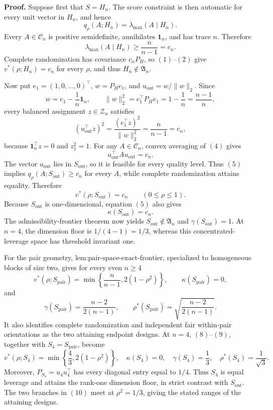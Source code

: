 \textbf{Proof.}
Suppose first that \(S=H_n\). The score constraint is then automatic for every unit vector in \(H_n\), and hence
\[
q_\rho(A;H_n)=\lambda_{\max}(A\mid H_n).
\tag{1}
\]
Every \(A\in\mathcal C_n\) is positive semidefinite, annihilates \(\mathbf1_n\), and has trace \(n\). Therefore
\[
\lambda_{\max}(A\mid H_n)\geq\frac{n}{n-1}=c_n.
\tag{2}
\]
Complete randomization has covariance \(c_nP_H\), so \((1)\)--\((2)\) give \(v^*(\rho;H_n)=c_n\) for every \(\rho\), and thus \(H_n\notin\mathfrak A_n\).

Now put \(e_1=(1,0,\ldots,0)^\top\), \(w=P_He_1\), and \(u_{\mathrm{out}}=w/\|w\|_2\). Since
\[
w=e_1-\frac1n\mathbf1_n,
\qquad
\|w\|_2^2=e_1^\top P_He_1=1-\frac1n=\frac{n-1}{n},
\tag{3}
\]
every balanced assignment \(z\in\mathcal Z_n\) satisfies
\[
(u_{\mathrm{out}}^\top z)^2
=\frac{(e_1^\top z)^2}{\|w\|_2^2}
=\frac{n}{n-1}=c_n,
\tag{4}
\]
because \(\mathbf1_n^\top z=0\) and \(z_1^2=1\). For any \(A\in\mathcal C_n\), convex averaging of \((4)\) gives
\[
u_{\mathrm{out}}^\top Au_{\mathrm{out}}=c_n.
\tag{5}
\]
The vector \(u_{\mathrm{out}}\) lies in \(S_{\mathrm{out}}\), so it is feasible for every quality level. Thus \((5)\) implies \(q_\rho(A;S_{\mathrm{out}})\geq c_n\) for every \(A\), while complete randomization attains equality. Therefore
\[
v^*(\rho;S_{\mathrm{out}})=c_n
\qquad(0\leq\rho\leq1).
\tag{6}
\]
Because \(S_{\mathrm{out}}\) is one-dimensional, equation \((5)\) also gives
\[
\kappa(S_{\mathrm{out}})=c_n.
\tag{7}
\]
The admissibility-frontier theorem now yields \(S_{\mathrm{out}}\notin\mathfrak A_n\) and \(\gamma(S_{\mathrm{out}})=1\). At \(n=4\), the dimension floor is \(1/(4-1)=1/3\), whereas this concentrated-leverage space has threshold invariant one.

For the pair geometry, \(\text{lem:pair-space-exact-frontier}\), specialized to homogeneous blocks of size two, gives for every even \(n\geq4\)
\[
v^*(\rho;S_{\mathrm{pair}})
=\min\left\{\frac{n}{n-1},2(1-\rho^2)\right\},
\qquad
\kappa(S_{\mathrm{pair}})=0,
\tag{8}
\]
and
\[
\gamma(S_{\mathrm{pair}})=\frac{n-2}{2(n-1)},
\qquad
\rho^*(S_{\mathrm{pair}})=\sqrt{\frac{n-2}{2(n-1)}}.
\tag{9}
\]
It also identifies complete randomization and independent fair within-pair orientations as the two attaining endpoint designs. At \(n=4\), \((8)\)--\((9)\), together with \(S_4=S_{\mathrm{pair}}\), become
\[
v^*(\rho;S_4)=\min\left\{\frac43,2(1-\rho^2)\right\},
\quad
\kappa(S_4)=0,
\quad
\gamma(S_4)=\frac13,
\quad
\rho^*(S_4)=\frac1{\sqrt3}.
\tag{10}
\]
Moreover, \(P_{S_4}=u_4u_4^\top\) has every diagonal entry equal to \(1/4\). Thus \(S_4\) is equal leverage and attains the rank-one dimension floor, in strict contrast with \(S_{\mathrm{out}}\). The two branches in \((10)\) meet at \(\rho^2=1/3\), giving the stated ranges of the attaining designs.

